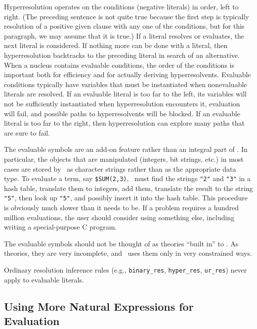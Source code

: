 \documentclass[11pt]{article}
\begin{document}
Hyperresolution operates on the conditions (negative literals) in
order, left to right.  (The preceding sentence is not quite true
because the first step is typically resolution of a positive given
clause with any one of the conditions,
but for this paragraph, we may assume that it is true.)
If a literal resolves or evaluates, the next literal is considered.
If nothing more can be done with a literal, then hyperresolution
backtracks to the preceding literal in search of an alternative.
When a nucleus
contains evaluable conditions, the order of the conditions is
important both for efficiency and for actually deriving
hyperresolvents.  Evaluable conditions typically have variables
that must be instantiated when nonevaluable literals are resolved.
If an evaluable literal is too far to the left, its variables
will not be sufficiently instantiated when hyperresolution encounters it,
evaluation will fail, and possible paths to hyperresolvents will be
blocked.  
If an evaluable literal is too far to the right, then hyperresolution can
explore many paths that are sure to fail.

  The evaluable symbols
are an add-on feature rather than an integral part of \otter.  In
particular, the objects that are manipulated (integers, bit strings, etc.)
in most cases are stored by \otter\ as character strings rather than
as the appropriate data type.  To evaluate a term, say \verb:$SUM(2,3):,
\otter\ must find the strings \verb:"2": and \verb:"3": in a hash table,
translate them to integers, add them, translate the result to the
string \verb:"5":, then look up \verb:"5":, and possibly insert it into
the hash table.  This procedure is obviously much slower than it needs
to be.  If a problem requires a hundred million
evaluations, the user should consider using something else, including
writing a special-purpose C program.

  The evaluable symbols should not be thought of as
theories ``built in'' to \otter.
As theories, they are very incomplete, and \otter\ uses them only in
very constrained ways.

  Ordinary resolution inference rules
(e.g., \verb:binary_res:, \verb:hyper_res:, \verb:ur_res:)
never apply to evaluable literals.

\subsection{Using More Natural Expressions for Evaluation} \label{make-eval}
\end{document}
